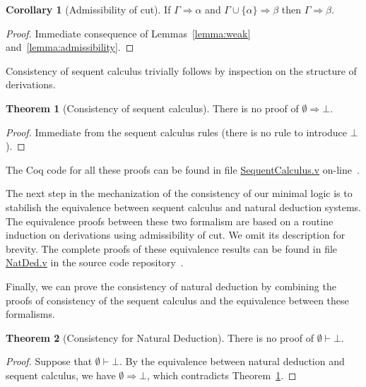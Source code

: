 \documentclass[12pt]{article}
\theoremstyle{definition}
\newtheorem{Theorem}{Theorem}
\newtheorem{Corollary}{Corollary}
\begin{document}
\begin{Corollary}[Admissibility of cut]
  If $\Gamma \Rightarrow \alpha$ and $\Gamma \cup\{\alpha\}\Rightarrow \beta$
  then $\Gamma \Rightarrow \beta$.
\end{Corollary}
\begin{proof}
  Immediate consequence of Lemmas~\ref{lemma:weak} and~\ref{lemma:admissibility}.
\end{proof}

Consistency of sequent calculus trivially follows by inspection on the structure of
derivations.

\begin{Theorem}[Consistency of sequent calculus]\label{theorem:consistency}
  There is no proof of $\emptyset \Rightarrow \bot$.
\end{Theorem}
\begin{proof}
  Immediate from the sequent calculus rules (there is no rule to introduce $\bot$).
\end{proof}

The Coq code for all these proofs can be found in file
\href{https://github.com/rodrigogribeiro/consistency-coq/blob/master/Minimal/SequentCalculus.v}{SequentCalculus.v}
on-line~\cite{Sasdelli20}.

The next step in the mechanization of the
consistency of our minimal logic is to stabilish the equivalence between sequent
calculus and natural deduction systems. The equivalence proofs between these two
formalism are based on a routine induction on derivations using admissibility of
cut. We omit its description for brevity. The complete proofs of these
equivalence results can be found in file
\href{https://github.com/rodrigogribeiro/consistency-coq/blob/master/Minimal/NatDed.v}{NatDed.v} in the source code
repository~\cite{Sasdelli20}.

Finally, we can prove the consistency of natural deduction by combining the
proofs of consistency of the sequent calculus and the equivalence between these
formalisms.

\begin{Theorem}[Consistency for Natural Deduction]
  There is no proof of $\emptyset \vdash \bot$.
\end{Theorem}
\begin{proof}
  Suppose that $\emptyset \vdash \bot$. By the equivalence between natural
  deduction and sequent calculus, we have $\emptyset\Rightarrow \bot$, which
  contradicts Theorem~\ref{theorem:consistency}.
\end{proof}  
\end{document}
